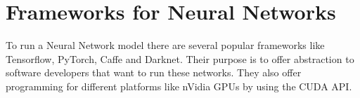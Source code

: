 \begin{table}[]
    \centering
    \resizebox{.6\textwidth}{!}{%
    \begin{tabular}{ll}
    \hline
    \textbf{Activation Functions} & \textbf{Computation Equation} \\ \hline \hline
    Sigmoid                       &  $\displaystyle f(x)=\frac{1}{1+ e^{-x}}$                             \\ \hline
    Tanh                          &  $\displaystyle f(x)=\frac{e^{x}-e^{-x}}{e^{x}+e^{-x}}$                            \\ \hline
    Softmax                       &  $\displaystyle f(x_{i})=\frac{x_{i}}{\sum_{j}e^{x_{j}}}$                             \\ \hline
    ReLU                          &    $ f(x)=\begin{matrix}
        x & if & x\geq 0  \\ 
        0 & if & x< 0 
    \end{matrix} $                           \\ \hline
    LReLU                         &  $f(x)= \begin{matrix}
        x & if & x > 0  \\ 
        \alpha x & if & x \leq 0 
    \end{matrix} $                        \\ \hline
    ELU                           &             $ f(x)=\begin{matrix}
        x & if & x> 0  \\ 
        \alpha e^{x} - 1 & if & x\leq 0 
    \end{matrix} $                 \\ \hline
    \end{tabular}%
    }
    \caption{Popular Activation functions}
    \label{table:AF}
\end{table}



 \section{Frameworks for Neural Networks}
 \label{section:darknet}

To run a Neural Network model there are several popular frameworks like
Tensorflow, PyTorch, Caffe and Darknet.  Their purpose is to offer abstraction
to software developers that want to run these networks. They also offer
programming for different platforms like nVidia GPUs by using the CUDA API.

